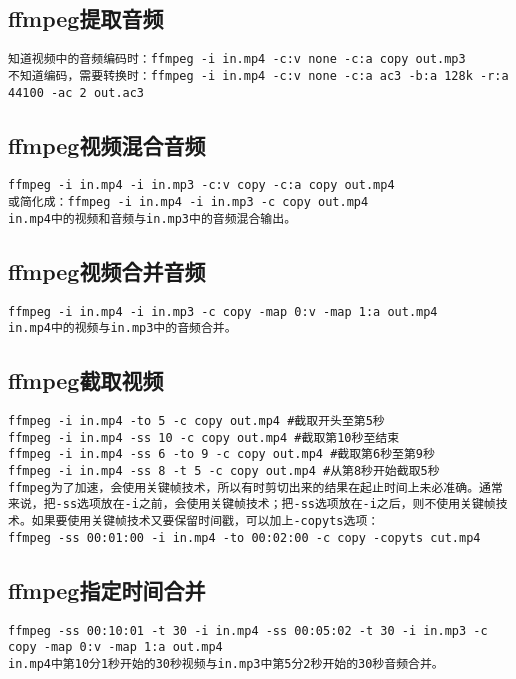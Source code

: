 \documentclass[a4paper,fontset=fandol,zihao=-4,linespread=1.2]{ctexbook}
\begin{document}
\subsection{ffmpeg提取音频}
\begin{lstlisting}
知道视频中的音频编码时：ffmpeg -i in.mp4 -c:v none -c:a copy out.mp3
不知道编码，需要转换时：ffmpeg -i in.mp4 -c:v none -c:a ac3 -b:a 128k -r:a 44100 -ac 2 out.ac3
\end{lstlisting}

\subsection{ffmpeg视频混合音频}
\begin{lstlisting}
ffmpeg -i in.mp4 -i in.mp3 -c:v copy -c:a copy out.mp4
或简化成：ffmpeg -i in.mp4 -i in.mp3 -c copy out.mp4
in.mp4中的视频和音频与in.mp3中的音频混合输出。
\end{lstlisting}

\subsection{ffmpeg视频合并音频}
\begin{lstlisting}
ffmpeg -i in.mp4 -i in.mp3 -c copy -map 0:v -map 1:a out.mp4
in.mp4中的视频与in.mp3中的音频合并。
\end{lstlisting}

\subsection{ffmpeg截取视频}
\begin{lstlisting}
ffmpeg -i in.mp4 -to 5 -c copy out.mp4 #截取开头至第5秒
ffmpeg -i in.mp4 -ss 10 -c copy out.mp4 #截取第10秒至结束
ffmpeg -i in.mp4 -ss 6 -to 9 -c copy out.mp4 #截取第6秒至第9秒
ffmpeg -i in.mp4 -ss 8 -t 5 -c copy out.mp4 #从第8秒开始截取5秒
ffmpeg为了加速，会使用关键帧技术，所以有时剪切出来的结果在起止时间上未必准确。通常来说，把-ss选项放在-i之前，会使用关键帧技术；把-ss选项放在-i之后，则不使用关键帧技术。如果要使用关键帧技术又要保留时间戳，可以加上-copyts选项：
ffmpeg -ss 00:01:00 -i in.mp4 -to 00:02:00 -c copy -copyts cut.mp4
\end{lstlisting}

\subsection{ffmpeg指定时间合并}
\begin{lstlisting}
ffmpeg -ss 00:10:01 -t 30 -i in.mp4 -ss 00:05:02 -t 30 -i in.mp3 -c copy -map 0:v -map 1:a out.mp4
in.mp4中第10分1秒开始的30秒视频与in.mp3中第5分2秒开始的30秒音频合并。
\end{lstlisting}
\end{document}
